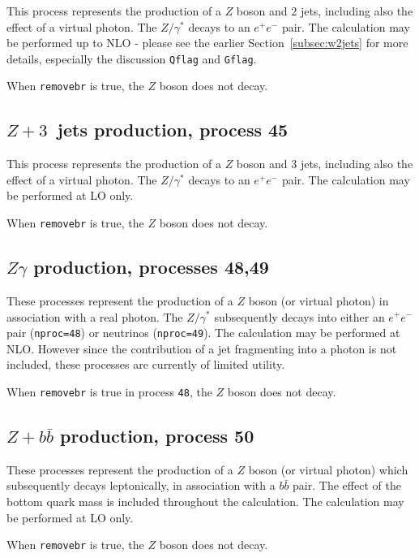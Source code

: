 \documentclass[12pt]{article}
\begin{document}
This process represents the production of a $Z$ boson and $2$ jets,
including also the effect of a virtual photon. The $Z/\gamma^*$ decays
to an $e^+ e^-$ pair.  The calculation may be performed up to NLO -
please see the earlier Section~\ref{subsec:w2jets} for more details,
especially the discussion {\tt Qflag} and {\tt Gflag}.

When {\tt removebr} is true, the $Z$ boson does not decay.

\subsection{$Z+3$~jets production, process 45}
\label{subsec:z3jets}

This process represents the production of a $Z$ boson and $3$ jets,
including also the effect of a virtual photon. The $Z/\gamma^*$ decays
to an $e^+ e^-$ pair.  The calculation may be performed at LO only.

When {\tt removebr} is true, the $Z$ boson does not decay.

\subsection{$Z\gamma$ production, processes 48,49}
\label{subsec:zgamma}

These processes represent the production of a $Z$ boson (or virtual photon)
in association with a real photon. The $Z/\gamma^*$ subsequently decays into 
either an $e^+ e^-$ pair ({\tt nproc=48}) or neutrinos ({\tt nproc=49}).
The calculation may be performed at NLO. However since the contribution
of a jet fragmenting into a photon is not included, 
these processes are currently of limited utility.


When {\tt removebr} is true in process {\tt 48}, the $Z$ boson does not decay.

\subsection{$Z+b{\bar b}$ production, process 50}
\label{subsec:zbb}

These processes represent the production of a $Z$ boson (or virtual photon)
which subsequently decays leptonically, in association
with a $b{\bar b}$ pair. The effect of
the bottom quark mass is included throughout the calculation.  
The calculation may be performed at LO only.

When {\tt removebr} is true, the $Z$ boson does not decay.
\end{document}
